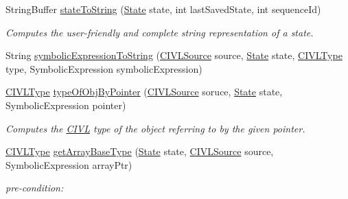 \begin{DoxyCompactItemize}
String\+Buffer \hyperlink{classedu_1_1udel_1_1cis_1_1vsl_1_1civl_1_1semantics_1_1common_1_1CommonSymbolicAnalyzer_ac8f6d6109c1d80505d84fb9c168fc1f8}{state\+To\+String} (\hyperlink{interfaceedu_1_1udel_1_1cis_1_1vsl_1_1civl_1_1state_1_1IF_1_1State}{State} state, int last\+Saved\+State, int sequence\+Id)
\begin{DoxyCompactList}\small\item\em Computes the user-\/friendly and complete string representation of a state. \end{DoxyCompactList}\item 
String \hyperlink{classedu_1_1udel_1_1cis_1_1vsl_1_1civl_1_1semantics_1_1common_1_1CommonSymbolicAnalyzer_a6ea8d25ad6bdb84a1b2b6d5f314177fe}{symbolic\+Expression\+To\+String} (\hyperlink{interfaceedu_1_1udel_1_1cis_1_1vsl_1_1civl_1_1model_1_1IF_1_1CIVLSource}{C\+I\+V\+L\+Source} source, \hyperlink{interfaceedu_1_1udel_1_1cis_1_1vsl_1_1civl_1_1state_1_1IF_1_1State}{State} state, \hyperlink{interfaceedu_1_1udel_1_1cis_1_1vsl_1_1civl_1_1model_1_1IF_1_1type_1_1CIVLType}{C\+I\+V\+L\+Type} type, Symbolic\+Expression symbolic\+Expression)
\item 
\hyperlink{interfaceedu_1_1udel_1_1cis_1_1vsl_1_1civl_1_1model_1_1IF_1_1type_1_1CIVLType}{C\+I\+V\+L\+Type} \hyperlink{classedu_1_1udel_1_1cis_1_1vsl_1_1civl_1_1semantics_1_1common_1_1CommonSymbolicAnalyzer_af88928932b58406b4a5dac52fb709070}{type\+Of\+Obj\+By\+Pointer} (\hyperlink{interfaceedu_1_1udel_1_1cis_1_1vsl_1_1civl_1_1model_1_1IF_1_1CIVLSource}{C\+I\+V\+L\+Source} soruce, \hyperlink{interfaceedu_1_1udel_1_1cis_1_1vsl_1_1civl_1_1state_1_1IF_1_1State}{State} state, Symbolic\+Expression pointer)
\begin{DoxyCompactList}\small\item\em Computes the \hyperlink{classedu_1_1udel_1_1cis_1_1vsl_1_1civl_1_1CIVL}{C\+I\+V\+L} type of the object referring to by the given pointer. \end{DoxyCompactList}\item 
\hyperlink{interfaceedu_1_1udel_1_1cis_1_1vsl_1_1civl_1_1model_1_1IF_1_1type_1_1CIVLType}{C\+I\+V\+L\+Type} \hyperlink{classedu_1_1udel_1_1cis_1_1vsl_1_1civl_1_1semantics_1_1common_1_1CommonSymbolicAnalyzer_a3d017b9b198ca3e4c66c3619af2b8c01}{get\+Array\+Base\+Type} (\hyperlink{interfaceedu_1_1udel_1_1cis_1_1vsl_1_1civl_1_1state_1_1IF_1_1State}{State} state, \hyperlink{interfaceedu_1_1udel_1_1cis_1_1vsl_1_1civl_1_1model_1_1IF_1_1CIVLSource}{C\+I\+V\+L\+Source} source, Symbolic\+Expression array\+Ptr)
\begin{DoxyCompactList}\small\item\em pre-\/condition\+: \end{DoxyCompactList}\item 

\end{DoxyCompactItemize}
